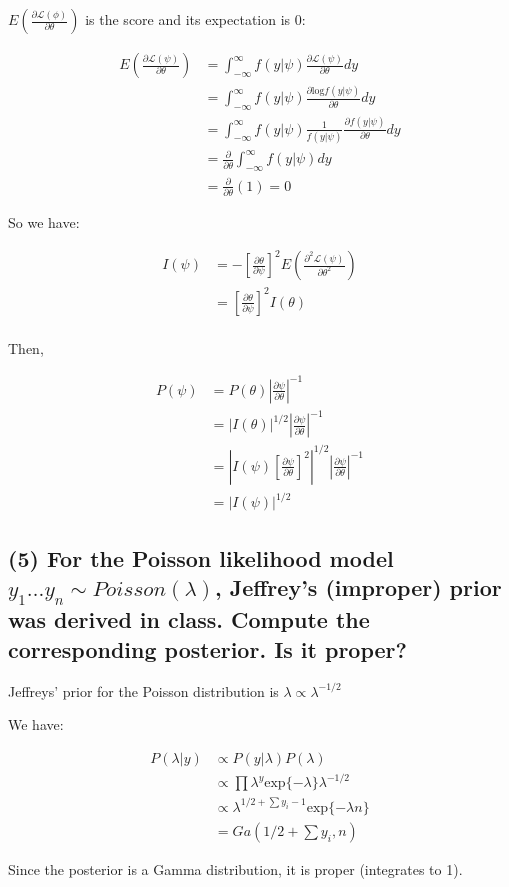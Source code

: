 \documentclass[11pt]{article}
\begin{document}
$E\left(\frac{\partial \mathcal{L}(\phi)}{\partial \theta} \right)$ is the score and its expectation is 0:

\begin{align*}
    E\left(\frac{\partial \mathcal{L}(\psi)}{\partial \theta} \right) &= \int^{\infty}_{-\infty} f(y|\psi)  \frac{\partial \mathcal{L}(\psi)}{\partial \theta} dy\\
    &= \int^{\infty}_{-\infty} f(y|\psi)  \frac{\partial \text{log}f(y|\psi) }{\partial \theta} dy\\
    &= \int^{\infty}_{-\infty} f(y|\psi) \frac{1}{f(y|\psi) }  \frac{\partial f(y|\psi) }{\partial \theta} dy\\
     &= \frac{\partial }{\partial \theta} \int^{\infty}_{-\infty}f(y|\psi) dy \\
     & = \frac{\partial }{\partial \theta} (1) = 0
\end{align*}

So we have:

\begin{align*}
    I(\psi) &=-\left[\frac{\partial \theta}{\partial \psi}\right]^2E\left(\frac{\partial^2\mathcal{L}(\psi)}{\partial \theta^2}\right)  \\
    &= \left[\frac{\partial \theta}{\partial \psi}\right]^2 I(\theta)\\
\end{align*}

Then, 

\begin{align*}
    P(\psi) &= P(\theta) \left|\frac{\partial \psi}{\partial \theta}\right|^{-1}\\
    &= |I(\theta)|^{1/2}\left|\frac{\partial \psi}{\partial \theta}\right|^{-1}\\
     &= \left|I(\psi)\left[\frac{\partial \psi}{\partial \theta}\right]^2\right|^{1/2}\left|\frac{\partial \psi}{\partial \theta}\right|^{-1}\\
     &= |I(\psi)|^{1/2}
\end{align*}
\subsection*{(5) For the Poisson likelihood model $y_1\ldots y_n
 \sim Poisson(\lambda)$, Jeffrey’s (improper) prior was derived in class. Compute the corresponding posterior. Is it proper?}

Jeffreys' prior for the Poisson distribution is $\lambda \propto \lambda^{-1/2}$

We have:

\begin{align*}
    P(\lambda|y) &\propto P(y|\lambda)P(\lambda)\\
    &\propto \prod \lambda^y\text{exp}\{-\lambda\}\lambda^{-1/2}\\
    &\propto  \lambda^{1/2 + \sum y_i - 1} \text{exp}\{-\lambda n\}\\
    &= Ga\left(1/2 + \sum y_i, n \right)
    \end{align*}
    
Since the posterior is a Gamma distribution, it is proper (integrates to 1).
\end{document}

